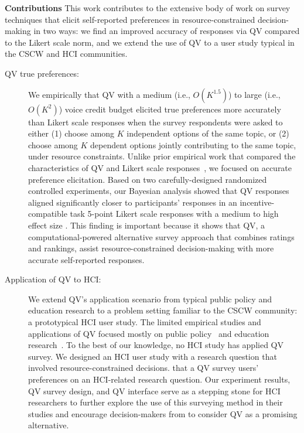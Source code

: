 \textbf{Contributions} This work contributes to the extensive body of work on survey techniques that elicit self-reported preferences in resource-constrained decision-making in two ways: we find an improved accuracy of responses via QV compared to the Likert scale norm, and we extend the use of QV to a user study typical in the CSCW and HCI communities.

\begin{description}
\item[QV {} true preferences:] We empirically {} that QV with a medium (i.e., $O(K^{1.5})$) to large (i.e., $O(K^{2})$) voice credit budget elicited true preferences more accurately than Likert scale responses when the survey respondents were asked to either (1) choose among $K$ independent options of the same topic, or (2) choose among $K$ dependent options jointly contributing to the same topic, under resource constraints. Unlike prior empirical work that compared the characteristics of QV and Likert scale responses~\cite{quarfoot2017quadratic, naylor2017first}, we focused on accurate preference elicitation. Based on two carefully-designed randomized controlled experiments, our Bayesian analysis showed that QV responses aligned significantly closer to participants' responses in an incentive-compatible task {} 5-point Likert scale responses with a medium to high effect size {}. This finding is important because it shows that QV, a computational-powered alternative survey approach that combines ratings and rankings, {} assist resource-constrained decision-making with more accurate self-reported responses.

\item[Application of QV to HCI:] We extend QV's application scenario from typical public policy and education research to a problem setting familiar to the CSCW community: a prototypical HCI user study. The limited {} empirical studies and applications of QV focused mostly on public policy~\cite{quarfoot2017quadratic, colorado_qv} and education research~\cite{naylor2017first}. To the best of our knowledge, no {} HCI study has applied QV {} survey. We designed an HCI user study with a research question that involved resource-constrained decisions. {} that a QV survey {} users' preferences on an HCI-related research question. Our experiment results, QV survey design, and QV interface serve as a stepping stone for HCI researchers {} to further explore the use of this surveying method in their studies and encourage decision-makers from {} to consider QV as a promising alternative.
\end{description}

